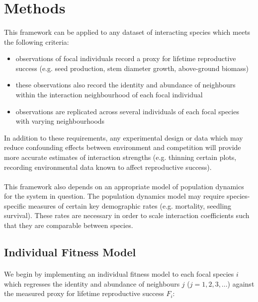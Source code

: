 \documentclass[a4,12pt]{article}
\begin{document}
    
\section{Methods}
    
    \paragraph{}
    This framework can be applied to any dataset of interacting species which meets the following criteria: 
    \begin{itemize}
        \item observations of focal individuals record a proxy for lifetime reproductive success (e.g. seed production, stem diameter growth, above-ground biomass)
        \item these observations also record the identity and abundance of neighbours within the interaction neighbourhood of each focal individual
        \item observations are replicated across several individuals of each focal species with varying neighbourhoods
    \end{itemize}
    In addition to these requirements, any experimental design or data which may reduce confounding effects between environment and competition will provide more accurate estimates of interaction strengths (e.g. thinning certain plots, recording environmental data known to affect reproductive success). 
    
    \paragraph{}   
    This framework also depends on an appropriate model of population dynamics for the system in question. The population dynamics model may require species-specific measures of certain key demographic rates (e.g. mortality, seedling survival). These rates are necessary in order to scale interaction coefficients such that they are comparable between species. 
    
    
    \subsection{Individual Fitness Model}
        
        \paragraph{}
        We begin by implementing an individual fitness model to each focal species $i$ which regresses the identity and abundance of neighbours $j$ ($j = 1, 2, 3, ...$) against the measured proxy for lifetime reproductive success $F_{i}$:
        
\end{document}
